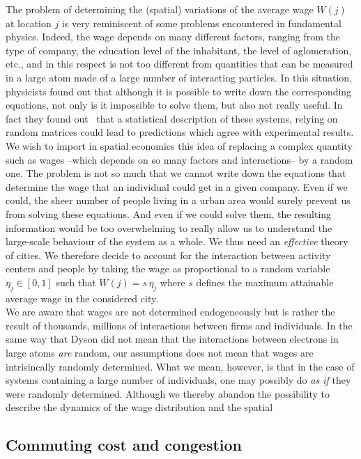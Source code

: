 The problem of determining the (spatial) variations of the average wage $W(j)$
at location $j$ is very reminiscent of some problems encountered in fundamental
physics. Indeed, the wage depends on many different factors, ranging from the
type of company, the education level of the inhabitant, the level of
aglomeration, etc., and in this respect is not too different from quantities
that can be measured in a large atom made of a large number of interacting
particles. In this situation, physicists found out that although it is possible
to write down the corresponding equations, not only is it impossible to solve
them, but also not really useful. In fact they found out~\cite{Dyson:1962} that
a statistical description of these systems, relying on random matrices could
lead to predictions which agree with experimental results.\\

We wish to import in spatial economics this idea of replacing a complex quantity
such as wages --which depends on so many factors and interactions-- by a random
one. The problem is not so much that we cannot write down the equations that
determine the wage that an individual could get in a given company. Even if we
could, the sheer number of people living in a urban area would surely prevent us
from solving these equations. And even if we could solve them, the resulting
information would be too overwhelming to really allow us to understand the
large-scale behaviour of the system as a whole. We thus need an \emph{effective}
theory of cities.
We therefore decide to account for the interaction between activity centers
and people by taking the wage as proportional to a random variable $\eta_j \in
\left[ 0,1\right]$ such that $W(j) = s\, \eta_j$ where $s$ defines the maximum
attainable average wage in the considered city.\\

We are aware that wages are not determined endogeneously but is rather the
result of thousands, millions of interactions between firms and individuals. In
the same way that Dyson did not mean that the interactions between electrons in
large atoms \emph{are} random, our assumptions does not mean that wages are
intrisincally randomly determined. What we mean, however, is that in the case of
systems containing a large number of individuals, one may possibly do \emph{as
if} they were randomly determined. Although we thereby abandon the possibility
to describe the dynamics of the wage distribution and the spatial 

\subsection{Commuting cost and congestion}
\label{sub:the_commuting_cost}


